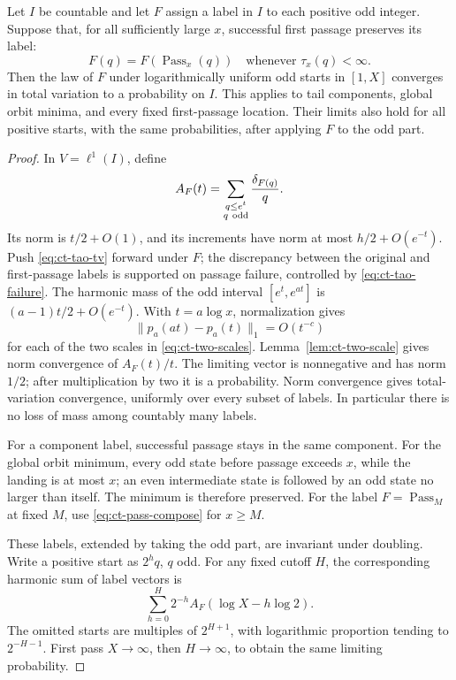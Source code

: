 \begin{proposition}\label{prop:ct-label-laws}
Let \(I\) be countable and let \(F\) assign a label in \(I\) to
each positive odd integer. Suppose that, for all sufficiently large
\(x\), successful first passage preserves its label:
\[
 F(q)=F(\operatorname{Pass}_x(q))
 \quad\text{whenever }\tau_x(q)<\infty.
\]
Then the law of \(F\) under logarithmically uniform odd starts in
\([1,X]\) converges in total variation to a probability on \(I\).
This applies to tail components, global orbit minima, and every
fixed first-passage location. Their limits also hold for all positive
starts, with the same probabilities, after applying \(F\) to the odd
part.
\end{proposition}
\begin{proof}
In \(V=\ell^1(I)\), define
\[
 A_F(t)=\sum_{\substack{q\le e^t\\q\ {\rm odd}}}
                       \frac{\delta_{F(q)}}q.
\]
Its norm is \(t/2+O(1)\), and its increments have norm
at most \(h/2+O(e^{-t})\). Push
\eqref{eq:ct-tao-tv} forward under \(F\); the discrepancy between
the original and first-passage labels is supported on passage
failure, controlled by \eqref{eq:ct-tao-failure}.
The harmonic mass of the odd interval \([e^t,e^{at}]\) is
\((a-1)t/2+O(e^{-t})\). With \(t=a\log x\), normalization gives
\[
 \|p_a(at)-p_a(t)\|_1=O(t^{-c})
\]
for each of the two scales in \eqref{eq:ct-two-scales}.
Lemma~\ref{lem:ct-two-scale} gives norm convergence of \(A_F(t)/t\).
The limiting vector is nonnegative and has norm \(1/2\); after
multiplication by two it is a probability. Norm convergence gives
total-variation convergence, uniformly over every subset of labels.
In particular there is no loss of mass among countably many labels.

For a component label, successful passage stays in the same
component. For the global orbit minimum, every odd state before
passage exceeds \(x\), while the landing is at most \(x\);
an even intermediate state is followed by an odd state no larger
than itself. The minimum is therefore preserved. For the label
\(F=\operatorname{Pass}_M\) at fixed \(M\), use
\eqref{eq:ct-pass-compose} for \(x\ge M\).

These labels, extended by taking the odd part, are invariant under
doubling. Write a positive start as \(2^hq\), \(q\) odd.
For any fixed cutoff \(H\), the corresponding harmonic sum of
label vectors is
\[
 \sum_{h=0}^H2^{-h}A_F(\log X-h\log2).
\]
The omitted starts are multiples of \(2^{H+1}\), with logarithmic
proportion tending to \(2^{-H-1}\). First pass \(X\to\infty\),
then \(H\to\infty\), to obtain the same limiting probability.
\end{proof}

